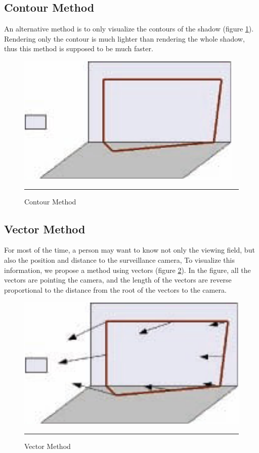 \subsection{Contour Method}

An alternative method is to only visualize the contours of the shadow (figure \ref{fig:ContourMethod}). Rendering only the contour is much lighter than rendering the whole shadow, thus this method is supposed to be much faster.

\begin{figure}[htbp]
	\centering
	\includegraphics{./Primitives/theory_contour.png}
	\rule{35em}{0.5pt}
	\caption[Contour Method]{Contour Method}
	\label{fig:ContourMethod}
\end{figure}

\subsection{Vector Method}

For most of the time, a person may want to know not only the viewing field, but also the position and distance to the surveillance camera, To visualize this information, we propose a method using vectors (figure \ref{fig:VectorMethod}). In the figure, all the vectors are pointing the camera, and the length of the vectors are reverse proportional to the distance from the root of the vectors to the camera.

\begin{figure}[htbp]
	\centering
	\includegraphics{./Primitives/theory_vector.png}
	\rule{35em}{0.5pt}
	\caption[Vector Method]{Vector Method}
	\label{fig:VectorMethod}
\end{figure}

